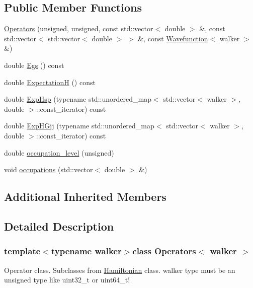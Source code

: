 \subsection*{Public Member Functions}
\begin{DoxyCompactItemize}
\item 
\hyperlink{class_operators_ae4bac9192cae36287079510f5f5dc794}{Operators} (unsigned, unsigned, const std\+::vector$<$ double $>$ \&, const std\+::vector$<$ std\+::vector$<$ double $>$ $>$ \&, const \hyperlink{class_wavefunction}{Wavefunction}$<$ walker $>$ \&)
\item 
double \hyperlink{class_operators_a047afdaf0c954f142325b8f14d9211f4}{Egs} () const 
\item 
double \hyperlink{class_operators_a6a8208aeba7b7a790d29f27574d5e435}{Expectation\+H} () const 
\item 
double \hyperlink{class_operators_ac773ffd750e58a7b7677946d2c8f7aca}{Exp\+Hsp} (typename std\+::unordered\+\_\+map$<$ std\+::vector$<$ walker $>$, double $>$\+::const\+\_\+iterator) const 
\item 
double \hyperlink{class_operators_a9b9e0389a6fc0219105959a5f9c761ad}{Exp\+H\+Gij} (typename std\+::unordered\+\_\+map$<$ std\+::vector$<$ walker $>$, double $>$\+::const\+\_\+iterator) const 
\item 
double \hyperlink{class_operators_af8b3a1ae13170fa9badcb0c35bbe25b7}{occupation\+\_\+level} (unsigned)
\item 
void \hyperlink{class_operators_a9308511b927ba7a0ca73ffc5af76ec48}{occupations} (std\+::vector$<$ double $>$ \&)
\end{DoxyCompactItemize}
\subsection*{Additional Inherited Members}


\subsection{Detailed Description}
\subsubsection*{template$<$typename walker$>$class Operators$<$ walker $>$}

Operator class. Subclasses from \hyperlink{class_hamiltonian}{Hamiltonian} class. walker type must be an unsigned type like uint32\+\_\+t or uint64\+\_\+t!


